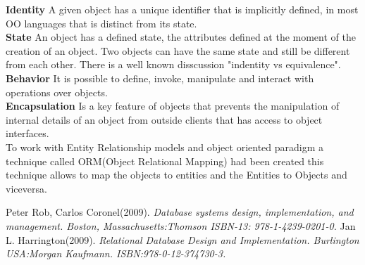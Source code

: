 \documentclass[11pt]{article}
\begin{document}
\textbf{Identity} A given object has a unique identifier that is implicitly defined, in most OO languages that is distinct from its state.\\
\textbf{State} An object has a defined state, the attributes defined at the moment of the creation of an object. Two objects can have the same state
and still be different from each other. There is a well known disscussion "indentity vs equivalence".\\
\textbf{Behavior} It is possible to define, invoke, manipulate and interact with operations over objects.\\
\textbf{Encapsulation} Is a key feature of objects that prevents the manipulation of internal details of an object from outside clients that has access
to object interfaces.\\

To work with Entity Relationship models and object oriented paradigm a technique called ORM(Object Relational Mapping) had been created
this technique allows to map the objects to entities and the Entities to Objects and viceversa.
\medskip
\begin{thebibliography}{9}
	Peter Rob, Carlos Coronel(2009).
	\textit{Database systems design, implementation, and management. Boston, Massachusetts:Thomson ISBN-13: 978-1-4239-0201-0.}
	Jan L. Harrington(2009).
	\textit{Relational Database Design and Implementation. Burlington USA:Morgan Kaufmann. ISBN:978-0-12-374730-3.}
\end{thebibliography}
\end{document}
